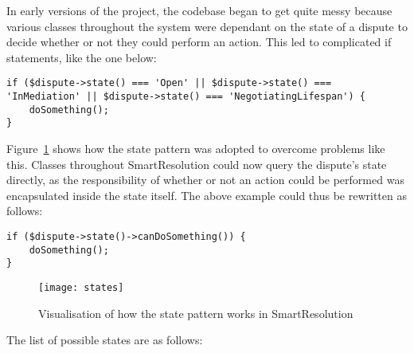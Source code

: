 In early versions of the project, the codebase began to get quite messy because various classes throughout the system were dependant on the state of a dispute to decide whether or not they could perform an action. This led to complicated if statements, like the one below:

\begin{lstlisting}
if ($dispute->state() === 'Open' || $dispute->state() === 'InMediation' || $dispute->state() === 'NegotiatingLifespan') {
    doSomething();
}
\end{lstlisting}

Figure~\ref{uml:states} shows how the state pattern was adopted to overcome problems like this. Classes throughout SmartResolution could now query the dispute's state directly, as the responsibility of whether or not an action could be performed was encapsulated inside the state itself. The above example could thus be rewritten as follows:

\begin{lstlisting}
if ($dispute->state()->canDoSomething()) {
    doSomething();
}
\end{lstlisting}

\begin{figure}[h!]
  \centering
    \ifimages
    \texttt{[image: states]}
    \fi
  \caption{Visualisation of how the state pattern works in SmartResolution}
  \label{uml:states}
\end{figure}

The list of possible states are as follows:

